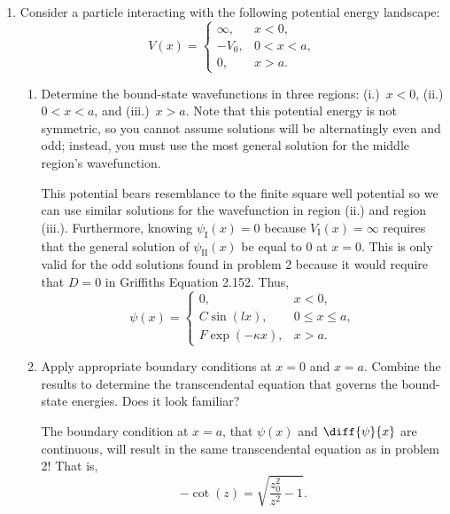 \documentclass[a4paper, 12pt]{config/homework}
\begin{document}
\begin{enumerate}
\vspace{\baselineskip}
\item Consider a particle interacting with the following potential energy landscape:
\[V(x) = \begin{cases}
\infty, & x < 0, \\ -V_0, & 0 < x < a, \\ 0, & x > a.
\end{cases}\]
\begin{enumerate}[label=(\alph*.)]
\item Determine the bound-state wavefunctions in three regions: (i.)~\(x < 0\), (ii.) \(0 < x < a\), and (iii.)~\(x > a\).
Note that this potential energy is not symmetric, so you cannot assume solutions will be alternatingly even and odd; instead, you must use the most general solution for the middle region's wavefunction.

This potential bears resemblance to the finite square well potential so we can use similar solutions for the wavefunction in region (ii.) and region (iii.). Furthermore, knowing \(\psi_\text{I}(x)=0\) because \(V_\text{I}(x)=\infty\) requires that the general solution of \(\psi_\text{II}(x)\) be equal to 0 at \(x=0\). This is only valid for the odd solutions found in problem 2 because it would require that \(D=0\) in Griffiths Equation 2.152. Thus,
\[\psi(x) = \begin{cases}
0, & x < 0, \\ C \sin(lx), & 0 \le x \le a, \\ F\exp(-\kappa x), & x > a.
\end{cases}\]

\item Apply appropriate boundary conditions at \(x=0\) and \(x=a\). Combine the results to determine the transcendental equation that governs the bound-state energies. Does it look familiar?

The boundary condition at \(x=a\), that \(\psi(x)\) and \(\diff{\psi}{x}\) are continuous, will result in the same transcendental equation as in problem 2! That is,
\[-\cot(z) = \sqrt{\frac{z_0^2}{z^2}-1}.\]

\end{enumerate}
\end{enumerate}
\end{document}
